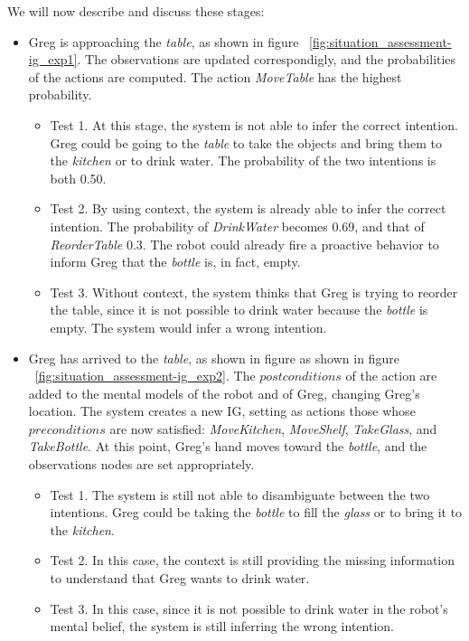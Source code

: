 We will now describe and discuss these stages:
\begin{itemize}
	\item Greg is approaching the \textit{table}, as shown in figure ~\ref{fig:situation_assessment-ig_exp1}. The observations are updated correspondigly, and the probabilities of the actions are computed. The action \textit{MoveTable} has the highest probability. 
		\begin{itemize}
			\item Test 1. At this stage, the system is not able to infer the correct intention. Greg could be going to the \textit{table} to take the objects and bring them to the \textit{kitchen} or to drink water. The probability of the two intentions is both 0.50.
			\item Test 2. By using context, the system is already able to infer the correct intention. The probability of \textit{DrinkWater} becomes 0.69, and that of \textit{ReorderTable} 0.3. The robot could already fire a proactive behavior to inform Greg that the \textit{bottle} is, in fact, empty.
			\item Test 3. Without context, the system thinks that Greg is trying to reorder the table, since it is not possible to drink water because the \textit{bottle} is empty. The system would infer a wrong intention.
		\end{itemize}
	\item Greg has arrived to the \textit{table}, as shown in figure as shown in figure ~\ref{fig:situation_assessment-ig_exp2}. The $postconditions$ of the action are added to the mental models of the robot and of Greg, changing Greg's location. The system creates a new IG, setting as actions those whose $preconditions$ are now satisfied: \textit{MoveKitchen}, \textit{MoveShelf}, \textit{TakeGlass}, and \textit{TakeBottle}. At this point, Greg's hand moves toward the \textit{bottle}, and the observations nodes are set appropriately.
		\begin{itemize}
			\item Test 1. The system is still not able to disambiguate between the two intentions. Greg could be taking the  \textit{bottle} to fill the \textit{glass} or to bring it to the \textit{kitchen}.
			\item Test 2. In this case, the context is still providing the missing information to understand that Greg wants to drink water.
			\item Test 3. In this case, since it is not possible to drink water in the robot's mental belief, the system is still inferring the wrong intention.

\end{itemize}
\end{itemize}
